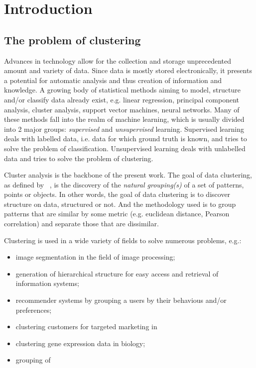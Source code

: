 \chapter{Introduction}
\label{chapter:introduction}


\section{The problem of clustering}
\label{sec:clustering}

Advances in technology allow for the collection and storage unprecedented amount and variety of data. Since data is mostly stored electronically, it presents a potential for automatic analysis and thus creation of information and knowledge. A growing body of statistical methods aiming to model, structure and/or classify data already exist, e.g. linear regression, principal component analysis, cluster analysis, support vector machines, neural networks. Many of these methods fall into the realm of machine learning, which is usually divided into 2 major groups: \textit{supervised} and \textit{unsupervised} learning.
Supervised learning deals with labelled data, i.e. data for which ground truth is known, and tries to solve the problem of classification. Unsupervised learning deals with unlabelled data and tries to solve the problem of clustering.

Cluster analysis is the backbone of the present work.
The goal of data clustering, as defined by ~\cite{Jain2010}, is the discovery of the \textit{natural grouping(s)} of a set of patterns, points or objects. In other words, the goal of data clustering is to discover structure on data, structured or not.
And the methodology used is to group patterns that are similar by some metric (e.g. euclidean distance, Pearson correlation) and separate those that are dissimilar. %

Clustering is used in a wide variety of fields to solve numerous problems, e.g.:
\begin{itemize}
\item image segmentation in the field of image processing;
\item generation of hierarchical structure for easy access and retrieval of information systems;
\item recommender systems by grouping a users by their behavious and/or preferences;
\item clustering customers for targeted marketing in 
\item clustering gene expression data in biology;
\item grouping of 
\end{itemize}


